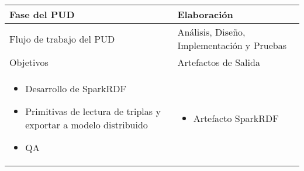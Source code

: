 \vspace{1cm}
\begin{tabular}{|p{}|p{}|}

\hline

\cellcolor[gray]{0.7}Fase del \acs{PUD} & Elaboración
 \\
\hline

\cellcolor[gray]{0.7}Flujo de trabajo del \acs{PUD} & Análisis, Diseño,
Implementación y Pruebas
 \\
\hline


\cellcolor[gray]{0.7}Objetivos  &
\cellcolor[gray]{0.7}Artefactos de Salida \\
\hline

\begin{itemize}
\item Desarrollo de SparkRDF
\item Primitivas de lectura de triplas y exportar a modelo distribuido
\item \acs{QA}
\end{itemize}

&

\begin{itemize}
\item Artefacto SparkRDF 
\end{itemize}
\\
\hline
\end{tabular}


